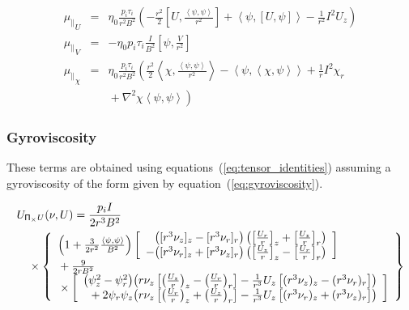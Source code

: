 \documentclass[letterpaper]{book}
\newcommand{\tensor}[1]{\mathsf{#1}}
\renewcommand{\P}{\tensor{\Pi}}
\newcommand{\lp}[1]{\nabla^2 #1}
\newcommand{\pb}[2]{\left[#1,#2\right]}
\newcommand{\ip}[2]{\left\langle  #1,#2\right\rangle}
\begin{document}
\begin{eqnarray*}
  {\mu_\parallel}_U & = & \eta_0 \frac{p_i \tau_i}{r^2 B^2} \left( 
  - \frac{r^2}{2} \pb{U}{\frac{\ip{\psi}{\psi}}{r^2}}
  + \ip{\psi}{\pb{U}{\psi}}
  - \frac{1}{r^2} I^2 U_z \right)
  \\
  {\mu_\parallel}_V & = & -\eta_0 p_i \tau_i \frac{I}{B^2} 
  \pb{\psi}{\frac{V}{r^2}}
  \\
  {\mu_\parallel}_\chi & = & \eta_0 \frac{p_i \tau_i}{r^2 B^2} \left(
    \frac{r^2}{2} \ip{\chi}{\frac{\ip{\psi}{\psi}}{r^2}}
  - \ip{\psi}{\ip{\chi}{\psi}}
  + \frac{1}{r} I^2 \chi_r 
  \right.\\ && \left. \mbox{}
  + \lp{\chi} \ip{\psi}{\psi}
  \right)
\end{eqnarray*}


\subsubsection{Gyroviscosity}

These terms are obtained using equations~(\ref{eq:tensor_identities})
assuming a gyroviscosity of the form given by
equation~(\ref{eq:gyroviscosity}).

\begin{eqnarray*}
  & \lefteqn{U_{\P_\times U}(\nu, U) = \frac{p_i I}{2 r^3 B^2}} & 
  \\ & & \mbox{} \times
    \left\{ \begin{array}{l} 
      \left(1+\frac{3}{2 r^2}\frac{\ip{\psi}{\psi}}{B^2}\right)
      \left[ \begin{array}{r@{}l}
	     & \left( [r^3 \nu_z]_z - [r^3 \nu_r]_r \right)
	       \left( \left[\frac{U_r}{r}\right]_z 
	            + \left[\frac{U_z}{r}\right]_r \right) 
             \\ \mbox{}
	   - & \left( [r^3 \nu_r]_z + [r^3 \nu_z]_r \right)
	       \left( \left[\frac{U_z}{r}\right]_z 
	            - \left[\frac{U_r}{r}\right]_r \right) 
	     \end{array} \right]
       \\ \mbox{}
      + \frac{9}{2 r B^2} 
      \\ \mbox{} \times \left[ 
	\begin{array}{r@{}l}
	  \left( \psi_z^2 - \psi_r^2 \right) &
	  \left( r \nu_z \left[ 
	    \left( \frac{U_z}{r} \right)_z -
	    \left( \frac{U_r}{r} \right)_r \right]
          -\frac{1}{r^3} U_z \left[ 
	    (r^3 \nu_z)_z - (r^3 \nu_r)_r \right] \right)
	  \\ 
	  \mbox{} + 2 \psi_r \psi_z &
          \left( r \nu_z \left[ 
	    \left( \frac{U_r}{r} \right)_z +
	    \left( \frac{U_z}{r} \right)_r \right]
          -\frac{1}{r^3} U_z \left[ 
	    (r^3 \nu_r)_z + (r^3 \nu_z)_r \right] \right)
	  \end{array} \right] 
    \end{array} \right\}
\end{eqnarray*}
\end{document}
